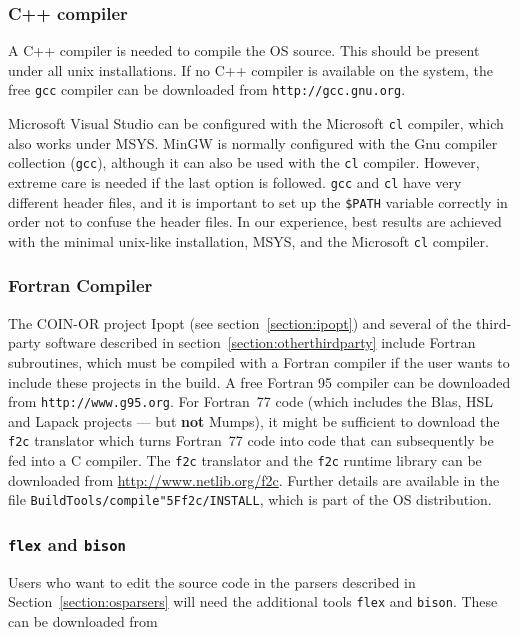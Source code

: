 \documentclass[11pt]{article}
\renewcommand{\_}{{\char"5F}}
\renewcommand{\{}{{\char"7B}}
\renewcommand{\}}{{\char"7D}}
\renewcommand{\^}{{\char"0D}}
\renewcommand{\'}{{\char"0D}}
\begin{document}
\subsubsection{C++ compiler}\label{section:cpp}
A C++ compiler is needed to compile the OS source. This should be present under all unix installations. 
If no C++ compiler is available on the system, the free {\tt gcc} compiler can be downloaded from 
{\tt http://gcc.gnu.org}.

Microsoft Visual Studio can be configured with the Microsoft {\tt cl} compiler, which also works under MSYS. 
MinGW is normally configured with the Gnu compiler collection ({\tt gcc}), although it can also be used with 
the {\tt cl} compiler. However, extreme care is needed if the last option is followed. {\tt gcc} and {\tt cl} 
have very different header files, and it is important to set up the {\tt \$PATH} variable correctly in order 
not to confuse the header files. In our experience, best results are achieved with the minimal unix-like 
installation, MSYS, and the Microsoft {\tt cl} compiler.

\subsubsection{Fortran Compiler}\label{section:fortran}
The COIN-OR project Ipopt (see section~\ref{section:ipopt}) and several of the third-party software 
described in section~\ref{section:otherthirdparty} include Fortran subroutines, which must be compiled 
with a Fortran compiler if the user wants to include these projects in the build. A free Fortran 95 compiler 
can be downloaded from {\tt http://www.g95.org}. For Fortran~77 code (which includes the Blas, 
HSL and Lapack projects --- but {\bf not} Mumps), it might be sufficient 
to download the {\tt f2c} translator 
which turns Fortran~77 code into code that can subsequently be fed into a C compiler. 
The {\tt f2c} translator and the {\tt f2c} runtime library can be downloaded from \url{http://www.netlib.org/f2c}. 
Further details are available in the file {\tt BuildTools/compile\_f2c/INSTALL}, which is part of the OS distribution.

\subsubsection{{\tt flex} and {\tt bison} }\label{section:flex} 
Users who want to edit the source code in the parsers described in
Section~\ref{section:osparsers} will need the additional  tools
{\tt flex} and {\tt bison}.  These can be downloaded from
\end{document}
